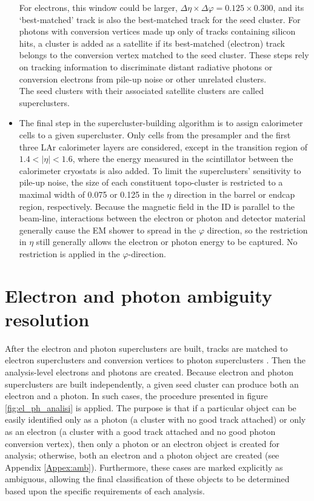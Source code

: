 \documentclass[a4paper, oneside, 11pt, openright]{book}
\begin{document}
\begin{itemize}
		For electrons, this window could be larger, $\Delta\eta \times \Delta\varphi = 0.125 \times 0.300$, and its ‘best-matched’ track is also the best-matched track for the seed cluster. For photons with conversion vertices made up only of tracks containing silicon hits, a cluster is added as a satellite if its best-matched (electron) track belongs to the conversion vertex matched to the seed cluster. These steps rely on tracking information to discriminate distant radiative photons or conversion electrons from pile-up noise or other unrelated clusters. \\
		The seed clusters with their associated satellite clusters are called superclusters.
		
		\item The final step in the supercluster-building algorithm is to assign calorimeter cells to a given supercluster. Only cells from the presampler and the first three LAr calorimeter layers are considered, except in the transition region of $1.4 < |\eta| < 1.6$, where the energy measured in the scintillator between the calorimeter cryostats is also added. To limit the superclusters’ sensitivity to pile-up noise, the size of each constituent topo-cluster is restricted to a maximal width of 0.075 or 0.125 in the $\eta$ direction in the barrel or endcap region, respectively. Because the magnetic field in the ID is parallel to the beam-line, interactions between the electron or photon and detector material generally cause the EM shower to spread in the $\varphi$ direction, so the restriction in $\eta$ still generally allows the electron or photon energy to be captured. No restriction is applied in the $\varphi$-direction.	
		\end{itemize}
		\section{Electron and photon ambiguity resolution}\label{section:creation}
		After the electron and photon superclusters are built, tracks are matched to electron superclusters and conversion vertices to photon superclusters \cite{El ph reco}. Then the analysis-level electrons and photons are created. Because electron and photon superclusters are built independently, a given seed cluster can produce both an electron and a photon. In such cases, the procedure presented in figure \ref{fig:el_ph_analisi} is applied. The purpose is that if a particular object can be easily identified only as a photon (a cluster with no good track attached) or only as an electron (a cluster with a good track attached and no good photon conversion vertex), then only a photon or an electron object is created for analysis; otherwise, both an electron and a photon object are created (see Appendix \ref{Appex:amb}). Furthermore, these cases are marked explicitly as ambiguous, allowing the final classification of these objects to be determined based upon the specific requirements of each analysis.
	
\end{document}
